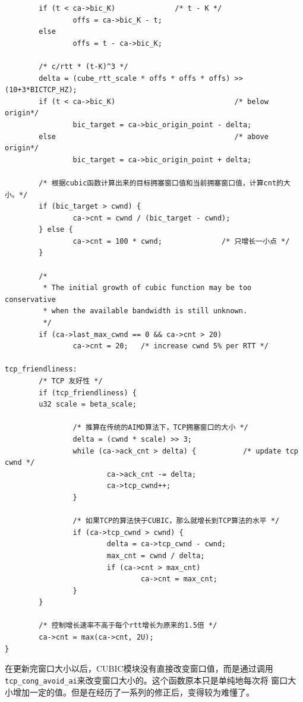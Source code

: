 \begin{verbatim}
        if (t < ca->bic_K)              /* t - K */
                offs = ca->bic_K - t;
        else
                offs = t - ca->bic_K;

        /* c/rtt * (t-K)^3 */
        delta = (cube_rtt_scale * offs * offs * offs) >> (10+3*BICTCP_HZ);
        if (t < ca->bic_K)                            /* below origin*/
                bic_target = ca->bic_origin_point - delta;
        else                                          /* above origin*/
                bic_target = ca->bic_origin_point + delta;

        /* 根据cubic函数计算出来的目标拥塞窗口值和当前拥塞窗口值，计算cnt的大小。*/
        if (bic_target > cwnd) {
                ca->cnt = cwnd / (bic_target - cwnd);
        } else {
                ca->cnt = 100 * cwnd;              /* 只增长一小点 */
        }

        /*
         * The initial growth of cubic function may be too conservative
         * when the available bandwidth is still unknown.
         */
        if (ca->last_max_cwnd == 0 && ca->cnt > 20)
                ca->cnt = 20;   /* increase cwnd 5% per RTT */

tcp_friendliness:
        /* TCP 友好性 */
        if (tcp_friendliness) {
        u32 scale = beta_scale;

                /* 推算在传统的AIMD算法下，TCP拥塞窗口的大小 */
                delta = (cwnd * scale) >> 3;
                while (ca->ack_cnt > delta) {           /* update tcp cwnd */
                        ca->ack_cnt -= delta;
                        ca->tcp_cwnd++;
                }
                
                /* 如果TCP的算法快于CUBIC，那么就增长到TCP算法的水平 */
                if (ca->tcp_cwnd > cwnd) {
                        delta = ca->tcp_cwnd - cwnd;
                        max_cnt = cwnd / delta;
                        if (ca->cnt > max_cnt)
                                ca->cnt = max_cnt;
                }
        }

        /* 控制增长速率不高于每个rtt增长为原来的1.5倍 */
        ca->cnt = max(ca->cnt, 2U);
}
\end{verbatim}
在更新完窗口大小以后，CUBIC模块没有直接改变窗口值，而是通过调用
\texttt{tcp_cong_avoid_ai}来改变窗口大小的。这个函数原本只是单纯地每次将
窗口大小增加一定的值。但是在经历了一系列的修正后，变得较为难懂了。
